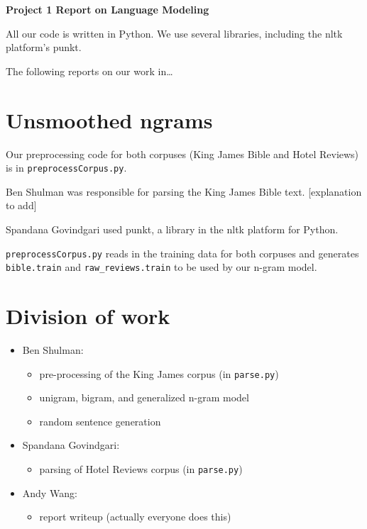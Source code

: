 \documentclass{article}
\begin{document}
\begin{center}\textbf{Project 1 Report on Language Modeling}\end{center}

All our code is written in Python. We use several libraries, including the nltk platform's punkt.\par
The following reports on our work in\ldots\par

\section{Unsmoothed ngrams}
Our preprocessing code for both corpuses (King James Bible and Hotel Reviews) is in \texttt{preprocessCorpus.py}.\par
Ben Shulman was responsible for parsing the King James Bible text. [explanation to add]\par
Spandana Govindgari used punkt, a library in the nltk platform for Python.\par
\texttt{preprocessCorpus.py} reads in the training data for both corpuses and generates \texttt{bible.train} and \texttt{raw\_reviews.train} to be used by our n-gram model.

\section{Division of work}
\begin{itemize}[noitemsep]
\item Ben Shulman:
  \begin{itemize}[noitemsep,nolistsep]
  \item pre-processing of the King James corpus (in \texttt{parse.py})
  \item unigram, bigram, and generalized n-gram model
  \item random sentence generation
  \end{itemize}

\item Spandana Govindgari:
  \begin{itemize}[noitemsep,nolistsep]
  \item parsing of Hotel Reviews corpus (in \texttt{parse.py})

  \end{itemize}

\item Andy Wang:
  \begin{itemize}[noitemsep,nolistsep]
  \item report writeup (actually everyone does this)
  \end{itemize}
\end{itemize}
\end{document}
